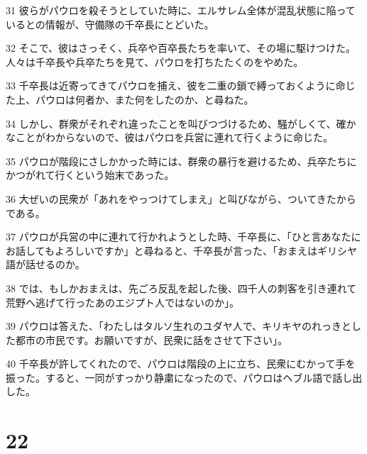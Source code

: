 \par 31 彼らがパウロを殺そうとしていた時に、エルサレム全体が混乱状態に陥っているとの情報が、守備隊の千卒長にとどいた。
\par 32 そこで、彼はさっそく、兵卒や百卒長たちを率いて、その場に駆けつけた。人々は千卒長や兵卒たちを見て、パウロを打ちたたくのをやめた。
\par 33 千卒長は近寄ってきてパウロを捕え、彼を二重の鎖で縛っておくように命じた上、パウロは何者か、また何をしたのか、と尋ねた。
\par 34 しかし、群衆がそれぞれ違ったことを叫びつづけるため、騒がしくて、確かなことがわからないので、彼はパウロを兵営に連れて行くように命じた。
\par 35 パウロが階段にさしかかった時には、群衆の暴行を避けるため、兵卒たちにかつがれて行くという始末であった。
\par 36 大ぜいの民衆が「あれをやっつけてしまえ」と叫びながら、ついてきたからである。
\par 37 パウロが兵営の中に連れて行かれようとした時、千卒長に、「ひと言あなたにお話してもよろしいですか」と尋ねると、千卒長が言った、「おまえはギリシヤ語が話せるのか。
\par 38 では、もしかおまえは、先ごろ反乱を起した後、四千人の刺客を引き連れて荒野へ逃げて行ったあのエジプト人ではないのか」。
\par 39 パウロは答えた、「わたしはタルソ生れのユダヤ人で、キリキヤのれっきとした都市の市民です。お願いですが、民衆に話をさせて下さい」。
\par 40 千卒長が許してくれたので、パウロは階段の上に立ち、民衆にむかって手を振った。すると、一同がすっかり静粛になったので、パウロはヘブル語で話し出した。

\chapter{22}

